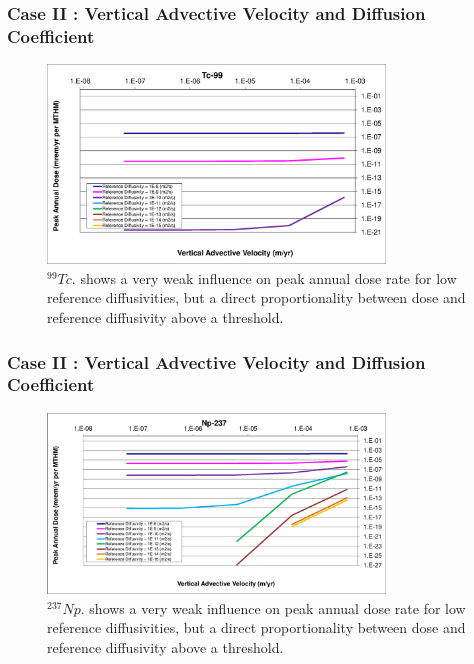\begin{frame}[c]
  \frametitle{Case II : Vertical Advective Velocity and Diffusion Coefficient}
\begin{figure}[ht!]
\centering
\includegraphics[width=0.8\textwidth]{AdvVelAndDiffCoeffEBSFail/Tc-99-VAdvVel.eps}
\caption{$^{99}Tc$.
shows a very weak influence on peak annual dose 
rate for low reference diffusivities, but a direct proportionality between 
dose and reference diffusivity above a threshold.}
\label{fig:VAdvVelTc99VAdvVel}
\end{figure}
\end{frame}


\begin{frame}[c]
  \frametitle{Case II : Vertical Advective Velocity and Diffusion Coefficient}
\begin{figure}[ht!]
\centering
\includegraphics[width=0.8\textwidth]{AdvVelAndDiffCoeffEBSFail/Np-237-VAdvVel.eps}
\caption{$^{237}Np$.
shows a very weak influence on peak annual dose 
rate for low reference diffusivities, but a direct proportionality between 
dose and reference diffusivity above a threshold.}
\label{fig:VAdvVelNp237VAdvVel}
\end{figure}
\end{frame}


